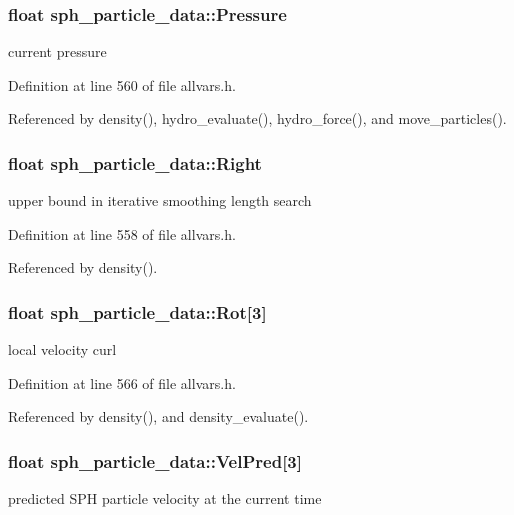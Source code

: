 \hypertarget{structsph__particle__data_a9201a97de5fe06f6ed6fcc33386eccda}{
\subsubsection[{Pressure}]{\setlength{\rightskip}{0pt plus 5cm}float {\bf sph\_\-particle\_\-data::Pressure}}}
\label{structsph__particle__data_a9201a97de5fe06f6ed6fcc33386eccda}
current pressure 

Definition at line 560 of file allvars.h.



Referenced by density(), hydro\_\-evaluate(), hydro\_\-force(), and move\_\-particles().

\hypertarget{structsph__particle__data_ae21f207de0a8a6f53cc891a7556f2592}{
\subsubsection[{Right}]{\setlength{\rightskip}{0pt plus 5cm}float {\bf sph\_\-particle\_\-data::Right}}}
\label{structsph__particle__data_ae21f207de0a8a6f53cc891a7556f2592}
upper bound in iterative smoothing length search 

Definition at line 558 of file allvars.h.



Referenced by density().

\hypertarget{structsph__particle__data_a6b9b7ed346c2d65d50dacd4b43cdd1d2}{
\subsubsection[{Rot}]{\setlength{\rightskip}{0pt plus 5cm}float {\bf sph\_\-particle\_\-data::Rot}\mbox{[}3\mbox{]}}}
\label{structsph__particle__data_a6b9b7ed346c2d65d50dacd4b43cdd1d2}
local velocity curl 

Definition at line 566 of file allvars.h.



Referenced by density(), and density\_\-evaluate().

\hypertarget{structsph__particle__data_a730acdc1da11f80da2214ebb76e6c2b3}{
\subsubsection[{VelPred}]{\setlength{\rightskip}{0pt plus 5cm}float {\bf sph\_\-particle\_\-data::VelPred}\mbox{[}3\mbox{]}}}
\label{structsph__particle__data_a730acdc1da11f80da2214ebb76e6c2b3}
predicted SPH particle velocity at the current time 

